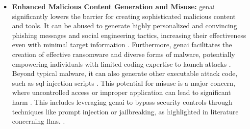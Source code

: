 \begin{itemize}
\item \textbf{Enhanced Malicious Content Generation and Misuse:} \gls{genai} significantly lowers the barrier for creating sophisticated malicious content and tools. It can be abused to generate highly personalized and convincing phishing messages and social engineering tactics, increasing their effectiveness even with minimal target information \cite{nyoto_cyber_2024}. Furthermore, \gls{genai} facilitates the creation of effective ransomware and diverse forms of malware, potentially empowering individuals with limited coding expertise to launch attacks \cite{nyoto_cyber_2024}. Beyond typical malware, it can also generate other executable attack code, such as \gls{sql} injection scripts \cite{nyoto_cyber_2024}. This potential for misuse is a major concern, where uncontrolled access or improper application can lead to significant harm \cite{surathunmanun_exploring_2024}. This includes leveraging \gls{genai} to bypass security controls through techniques like prompt injection or jailbreaking, as highlighted in literature concerning \glspl{llm}. \cite{surathunmanun_exploring_2024}.


\end{itemize}
